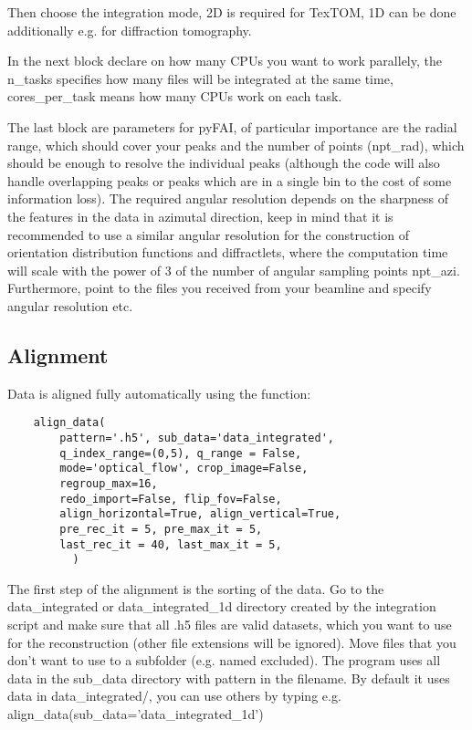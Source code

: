 Then choose the integration mode, 2D is required for TexTOM, 1D can be done additionally e.g. for diffraction tomography.

In the next block declare on how many CPUs you want to work parallely, the n\_tasks specifies how many files will be integrated
at the same time, cores\_per\_task means how many CPUs work on each task.

The last block are parameters for pyFAI, of particular importance are the radial range, which should cover your peaks
and the number of points (npt\_rad), which should be enough to resolve the individual peaks (although the code will
also handle overlapping peaks or peaks which are in a single bin to the cost of some information loss).
The required angular resolution depends on the sharpness of the features in the data in azimutal direction,
keep in mind that it is recommended to use a similar angular resolution for the construction of orientation
distribution functions and diffractlets, where the computation time will scale with the power of 3 of the number
of angular sampling points npt\_azi.  
Furthermore, point to the files you received from your beamline and specify angular resolution etc.

\subsection{Alignment}

Data is aligned fully automatically using the function:
\begin{verbatim}
    align_data( 
        pattern='.h5', sub_data='data_integrated', 
        q_index_range=(0,5), q_range = False,
        mode='optical_flow', crop_image=False, 
        regroup_max=16,
        redo_import=False, flip_fov=False, 
        align_horizontal=True, align_vertical=True,
        pre_rec_it = 5, pre_max_it = 5,
        last_rec_it = 40, last_max_it = 5,
          )
\end{verbatim}

The first step of the alignment is the sorting of the data. 
Go to the data\_integrated or data\_integrated\_1d directory created by the integration script
and make sure that all .h5 files are valid datasets, which you 
want to use for the reconstruction (other file extensions will be ignored). 
Move files that you don't want to use to a subfolder (e.g. named excluded).
The program uses all data in the sub\_data directory with pattern in the filename.
By default it uses data in data\_integrated/, you can use others by typing e.g. align\_data(sub\_data='data\_integrated\_1d')

